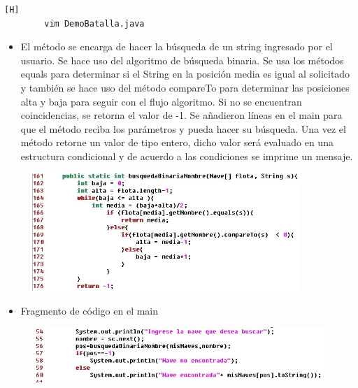 \documentclass{article}
\begin{document}
	
	

	
	\begin{lstlisting}[language=bash,caption={Implementado el método busquedaBinariaNombre }][H]
		vim DemoBatalla.java
	\end{lstlisting}
	
	
	\begin{itemize}	
		\item El método se encarga de hacer la búsqueda de un string ingresado por el usuario. Se hace uso del algoritmo de búsqueda binaria. Se usa los métodos equals para determinar si el String en la posición media es igual al solicitado y también se hace uso del método compareTo para determinar las posiciones alta y baja para seguir con el flujo algoritmo. Si no se encuentran coincidencias, se retorna el valor de -1. Se añadieron líneas en el main para que el método reciba los parámetros y pueda hacer su búsqueda. Una vez el método retorne un valor de tipo entero, dicho valor será evaluado en una estructura condicional y de acuerdo a las condiciones se imprime un mensaje.
	\end{itemize}	
	
	\begin{figure}[H]
		\centering
		\includegraphics[width=0.9\textwidth,keepaspectratio]{img/7.jpg}
	\end{figure}
	
	\begin{itemize}	
		\item Fragmento de código en el main
	\end{itemize}
	
	\begin{figure}[H]
		\centering
		\includegraphics[width=1.1\textwidth,keepaspectratio]{img/8.jpg}
	\end{figure}
	
\end{document}
